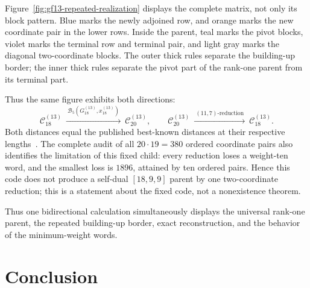 \documentclass[12pt]{article}
\begin{document}
\begin{samepage}
Figure~\ref{fig:gf13-repeated-realization} displays the complete matrix, not
only its block pattern.  Blue marks the newly adjoined row, and orange marks
the new coordinate pair in the lower rows.  Inside the parent, teal marks
the pivot blocks, violet marks the terminal row and terminal pair, and light
gray marks the diagonal two-coordinate blocks.  The outer thick rules
separate the building-up border; the inner thick rules separate the pivot
part of the rank-one parent from its terminal part.

\begin{center}
\centering
{}
\label{fig:gf13-repeated-realization}
\end{center}
\end{samepage}

Thus the same figure exhibits both directions:
\[
\mathcal C_{18}^{(13)}
\ \xrightarrow{\ \mathcal B_5(G_{18}^{(13)},x_{18}^{(13)})\ }\
\mathcal C_{20}^{(13)},
\qquad
\mathcal C_{20}^{(13)}
\ \xrightarrow{\ (11,7)\text{-reduction}\ }\
\mathcal C_{18}^{(13)}.
\]
Both distances equal the published best-known distances at their respective
lengths~\cite{KimChoi2021,BetsumiyaEtAl}.  The complete audit of all
\(20\cdot19=380\) ordered coordinate
pairs also identifies the limitation of this fixed child: every reduction
loses a weight-ten word, and the smallest loss is \(1896\), attained by ten
ordered pairs.  Hence this code does not produce a self-dual
\([18,9,9]\) parent by one two-coordinate reduction; this is a statement
about the fixed code, not a nonexistence theorem.

Thus one bidirectional calculation simultaneously displays the universal
rank-one parent, the repeated building-up border, exact reconstruction, and
the behavior of the minimum-weight words.
\section{Conclusion}
\label{sec:conclusion}
\end{document}
